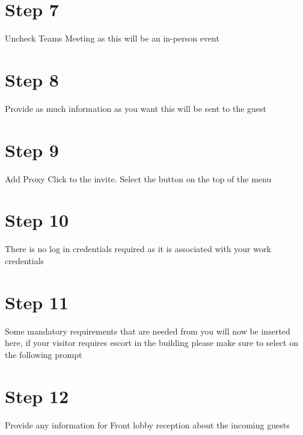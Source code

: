 \documentclass{../lib/lib-en}
\begin{document}

\newpage
\section*{\centering Step 7}
Uncheck Teams Meeting as this will be an in-person event


\newpage
\section*{\centering Step 8}
 Provide as much information as you want this will be sent to the guest


\newpage
\section*{\centering Step 9}
Add Proxy Click to the invite. Select the  button on the top of the menu


\newpage
\section*{\centering Step 10}
There is no log in credentials required as it is associated with your work credentials


\newpage
\section*{\centering Step 11}
Some mandatory requirements that are needed from you will now be inserted here, if your visitor requires escort in the building please make sure to select  on the following prompt


\newpage
\section*{\centering Step 12}
 Provide any information for Front lobby reception about the incoming guests
\end{document}

